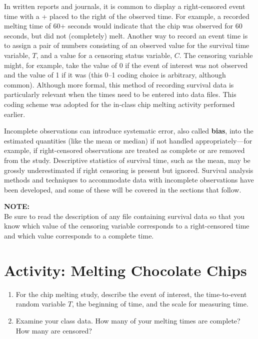 \documentclass[
]{report}
\providecommand{\tightlist}{%
  \setlength{\itemsep}{0pt}\setlength{\parskip}{0pt}}
\begin{document}
In written reports and journals, it is common to display a right-censored event time with a + placed to the right of the observed time. For example, a recorded melting time of 60+ seconds would indicate that the chip was observed for 60 seconds, but did not (completely) melt. Another way to record an event time is to assign a pair of numbers consisting of an observed value for the survival time variable, \(T\), and a value for a censoring status variable, \(C\). The censoring variable might, for example, take the value of 0 if the event of interest was not observed and the value of 1 if it was (this 0--1 coding choice is arbitrary, although common). Although more formal, this method of recording survival data is particularly relevant when the times need to be entered into data files. This coding scheme was adopted for the in-class chip melting activity performed earlier.

Incomplete observations can introduce systematic error, also called \textbf{bias}, into the estimated quantities (like the mean or median) if not handled appropriately---for example, if right-censored observations are treated as complete or are removed from the study. Descriptive statistics of survival time, such as the mean, may be grossly underestimated if right censoring is present but ignored. Survival analysis methods and techniques to accommodate data with incomplete observations have been developed, and some of these will be covered in the sections that follow.

\large

\textbf{NOTE:}\\
Be sure to read the description of any file containing survival data so that you know which value of the censoring variable corresponds to a right-censored time and which value corresponds to a complete time.\\
\normalsize

\section*{Activity: Melting Chocolate Chips}\label{activity-melting-chocolate-chips-1}

\begin{enumerate}
\def\labelenumi{\arabic{enumi}.}
\setcounter{enumi}{1}
\tightlist
\item
  For the chip melting study, describe the event of interest, the time-to-event random variable \(T\), the beginning of time, and the scale for measuring time.\\
\item
  Examine your class data. How many of your melting times are complete? How many are censored?
\end{enumerate}
\end{document}
